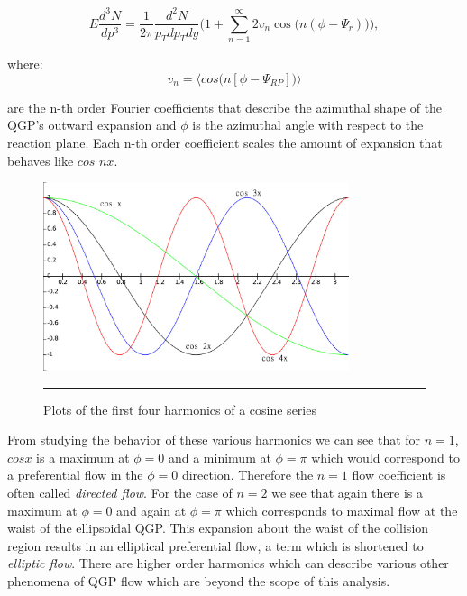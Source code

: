 \begin{equation}
E \frac{d^{3}N}{dp^{3}} = \frac{1}{2 \pi} \frac{d^{2}N}{p_{T} dp_{T}dy}\Big( 1 + \sum^{\infty}_{n=1} 2 v_{n} \cos\big(n(\phi - \Psi_{r})\big) \Big),
\end{equation}

where:
\begin{equation}
v_{n} = \bigg \langle cos \Big( n [\phi - \Psi_{RP}]\Big) \bigg \rangle
\end{equation}

are the n-th order Fourier coefficients that describe the azimuthal shape of the QGP's outward expansion and $\phi$ is the azimuthal angle with respect to the reaction plane. Each n-th order coefficient scales the amount of expansion that behaves like $cos$ $nx$.

\begin{figure}[htbp!]
  \centering
    \includegraphics[width=0.8\textwidth]{Figures/fouriercosines.jpg}
    \rule{35em}{0.5pt}
  \caption[Plots of the first four harmonics of a cosine series]{Plots of the first four harmonics of a cosine series}
  \label{fig:fouriercosines}
\end{figure}

From studying the behavior of these various harmonics we can see that for $n=1$, $cos x$ is a maximum at $\phi=0$ and a minimum at $\phi = \pi$ which would correspond to a preferential flow in the $\phi=0$ direction. Therefore the $n=1$ flow coefficient is often called \textit{directed flow}. For the case of $n=2$ we see that again there is a maximum at $\phi=0$ and again at $\phi=\pi$ which corresponds to maximal flow at the waist of the ellipsoidal QGP. This expansion about the waist of the collision region results in an elliptical preferential flow, a term which is shortened to \textit{elliptic flow}. There are higher order harmonics which can describe various other phenomena of QGP flow which are beyond the scope of this analysis.

\pagebreak
\pagebreak
